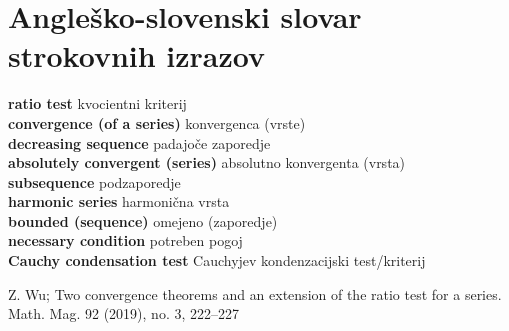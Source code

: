 \documentclass[a4paper,12pt]{article}
\newcommand{\geslo}[2]{\noindent\textbf{#1} \quad \hangindent=1cm #2\\[-1pc]}
\begin{document}
\section{Angleško-slovenski slovar strokovnih izrazov}

\geslo{ratio test}{kvocientni kriterij}

\geslo{convergence (of a series)}{konvergenca (vrste)}

\geslo{decreasing sequence}{padajoče zaporedje}

\geslo{absolutely convergent (series)}{absolutno konvergenta (vrsta)}

\geslo{subsequence}{podzaporedje}

\geslo{harmonic series}{harmonična vrsta}

\geslo{bounded (sequence)}{omejeno (zaporedje)}

\geslo{necessary condition}{potreben pogoj}

\geslo{Cauchy condensation test}{Cauchyjev kondenzacijski test/kriterij}






\begin{abstract}
\end{abstract}


\tableofcontents

\pagebreak










\begin{thebibliography}{1}
    Z. Wu; Two convergence theorems and an extension of the ratio test for a
    series. Math. Mag. 92 (2019), no. 3, 222–227
\end{thebibliography}

\end{document}
